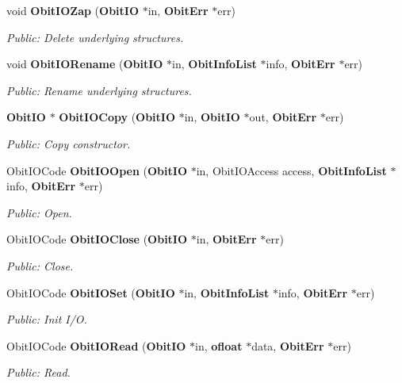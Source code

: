 \begin{CompactItemize}
void {\bf Obit\-IOZap} ({\bf Obit\-IO} $\ast$in, {\bf Obit\-Err} $\ast$err)
\begin{CompactList}\small\item\em Public: Delete underlying structures. \item\end{CompactList}\item 
void {\bf Obit\-IORename} ({\bf Obit\-IO} $\ast$in, {\bf Obit\-Info\-List} $\ast$info, {\bf Obit\-Err} $\ast$err)
\begin{CompactList}\small\item\em Public: Rename underlying structures. \item\end{CompactList}\item 
{\bf Obit\-IO} $\ast$ {\bf Obit\-IOCopy} ({\bf Obit\-IO} $\ast$in, {\bf Obit\-IO} $\ast$out, {\bf Obit\-Err} $\ast$err)
\begin{CompactList}\small\item\em Public: Copy constructor. \item\end{CompactList}\item 
Obit\-IOCode {\bf Obit\-IOOpen} ({\bf Obit\-IO} $\ast$in, Obit\-IOAccess access, {\bf Obit\-Info\-List} $\ast$info, {\bf Obit\-Err} $\ast$err)
\begin{CompactList}\small\item\em Public: Open. \item\end{CompactList}\item 
Obit\-IOCode {\bf Obit\-IOClose} ({\bf Obit\-IO} $\ast$in, {\bf Obit\-Err} $\ast$err)
\begin{CompactList}\small\item\em Public: Close. \item\end{CompactList}\item 
Obit\-IOCode {\bf Obit\-IOSet} ({\bf Obit\-IO} $\ast$in, {\bf Obit\-Info\-List} $\ast$info, {\bf Obit\-Err} $\ast$err)
\begin{CompactList}\small\item\em Public: Init I/O. \item\end{CompactList}\item 
Obit\-IOCode {\bf Obit\-IORead} ({\bf Obit\-IO} $\ast$in, {\bf ofloat} $\ast$data, {\bf Obit\-Err} $\ast$err)
\begin{CompactList}\small\item\em Public: Read. \item\end{CompactList}\item 

\end{CompactItemize}
